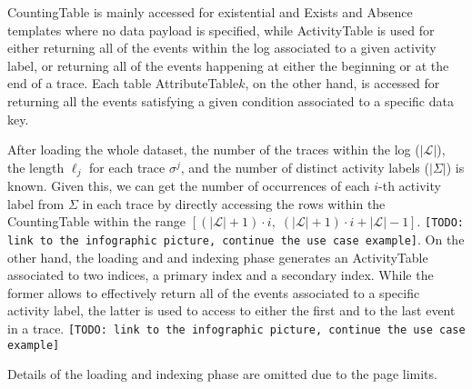 \textsf{CountingTable} is mainly accessed for existential and \textsf{Exists} and \textsf{Absence} templates where no data payload is specified, while  \textsf{ActivityTable} is  used for either returning all of the events within the log associated to a given activity label, or returning all of the events happening at either the beginning or at the end of a trace. Each table \textsf{AttributeTable$k$}, on the other hand, is accessed for returning all the events satisfying a given condition associated to a specific data key. %

After loading the whole dataset, the number of the traces within the log ($|\mathcal{L}|$), the length $\ell_j$ for each trace $\sigma^j$, and the number of distinct activity labels ($|\Sigma|$) is known. Given this, we can get the number of occurrences of each $i$-th activity label from $\Sigma$ in each trace by directly accessing the rows within the \textsf{CountingTable} within the range $[(|\mathcal{L}|+1)\cdot i,\; (|\mathcal{L}|+1)\cdot i+|\mathcal{L}|-1]$.
\texttt{\color{red}[TODO: link to the infographic picture, continue the use case example]}. On the other hand, the loading and and indexing phase generates an \textsf{ActivityTable} associated to two indices, a primary index and a secondary index. While the former allows to effectively return all of the events associated to a specific activity label, the latter is used to access to either the first and to the last event in a trace.  \texttt{\color{red}[TODO: link to the infographic picture, continue the use case example]}

Details of the loading and indexing phase are omitted due to the page limits.



